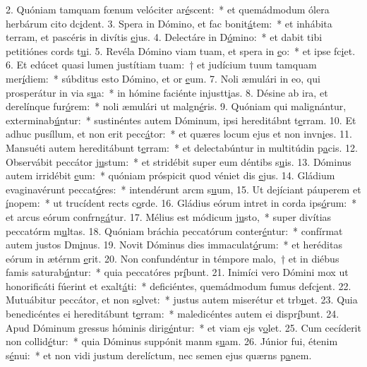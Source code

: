 2. Quóniam tamquam fœnum velóciter ar\uline{é}scent:~* et quemádmodum ólera herbárum cito dc\uline{i}dent.
3. Spera in Dómino, et fac bonit\uline{á}tem:~* et inhábita terram, et pascéris in divítis \uline{e}jus.
4. Delectáre in D\uline{ó}mino:~* et dabit tibi petitiónes cords t\uline{u}i.
5. Revéla Dómino viam tuam, et spera in \uline{e}o:~* et ipse fc\uline{i}et.
6. Et edúcet quasi lumen justítiam tuam:~† et judícium tuum tamquam mer\uline{í}diem:~* súbditus esto Dómino, et or \uline{e}um.
7. Noli æmulári in eo, qui prosperátur in via s\uline{u}a:~* in hómine faciénte injustt\uline{i}as.
8. Désine ab ira, et derelínque fur\uline{ó}rem:~* noli æmulári ut malgn\uline{é}ris.
9. Quóniam qui malignántur, exterminab\uline{ú}ntur:~* sustinéntes autem Dóminum, ipsi hereditábnt t\uline{e}rram.
10. Et adhuc pusíllum, et non erit pecc\uline{á}tor:~* et quæres locum ejus et non invn\uline{i}es.
11. Mansuéti autem hereditábunt t\uline{e}rram:~* et delectabúntur in multitúdin p\uline{a}cis.
12. Observábit peccátor j\uline{u}stum:~* et stridébit super eum déntibs s\uline{u}is.
13. Dóminus autem irridébit \uline{e}um:~* quóniam próspicit quod véniet dis \uline{e}jus.
14. Gládium evaginavérunt peccat\uline{ó}res:~* intendérunt arcm s\uline{u}um,
15. Ut dejíciant páuperem et \uline{í}nopem:~* ut trucídent rects c\uline{o}rde.
16. Gládius eórum intret in corda ips\uline{ó}rum:~* et arcus eórum confrng\uline{á}tur.
17. Mélius est módicum j\uline{u}sto,~* super divítias peccatórm m\uline{u}ltas.
18. Quóniam bráchia peccatórum conter\uline{é}ntur:~* confírmat autem justos Dm\uline{i}nus.
19. Novit Dóminus dies immaculat\uline{ó}rum:~* et heréditas eórum in ætérnm \uline{e}rit.
20. Non confundéntur in témpore malo,~† et in diébus famis saturab\uline{ú}ntur:~* quia peccatóres pr\uline{í}bunt.
21. Inimíci vero Dómini mox ut honorificáti fúerint et exalt\uline{á}ti:~* deficiéntes, quemádmodum fumus defc\uline{i}ent.
22. Mutuábitur peccátor, et non s\uline{o}lvet:~* justus autem miserétur et trb\uline{u}et.
23. Quia benedicéntes ei hereditábunt t\uline{e}rram:~* maledicéntes autem ei dispr\uline{í}bunt.
24. Apud Dóminum gressus hóminis dirig\uline{é}ntur:~* et viam ejs v\uline{o}let.
25. Cum cecíderit non collid\uline{é}tur:~* quia Dóminus suppónit manm s\uline{u}am.
26. Júnior fui, étenim s\uline{é}nui:~* et non vidi justum derelíctum, nec semen ejus quærns p\uline{a}nem.
